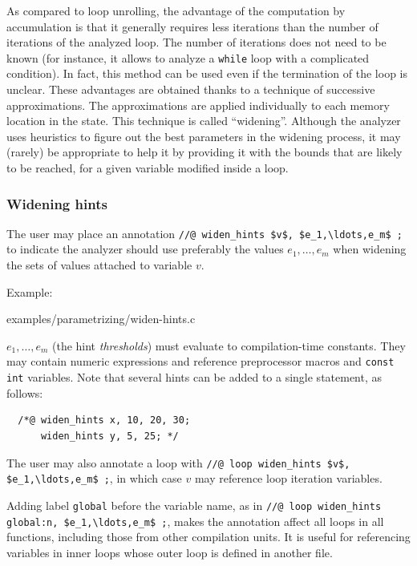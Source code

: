 \documentclass[web]{frama-c-book}
\begin{document}
As compared to loop unrolling, the advantage of the computation
by accumulation is that it generally requires less iterations
than the number of iterations of the analyzed loop. The number of
iterations does not need to be known (for instance, it allows to
analyze a \lstinline|while| loop with a complicated condition).
In fact, this method can be used even if the termination of
the loop is unclear. These advantages are obtained thanks to
a technique of successive approximations. The approximations
are applied individually to each memory location in the state.
This technique is called ``widening''.
Although the analyzer uses heuristics to figure out the best
parameters in the widening process, it may (rarely) be appropriate
to help it by providing it with the bounds that are likely to
be reached, for a given variable modified inside a loop.

\subsubsection{Widening hints}
\label{subsub:widen-hints}

The user may place an annotation \lstinline|//@ widen_hints $v$, $e_1,\ldots,e_m$ ;|
to indicate the analyzer should use preferably the values $e_1,\ldots,e_m$
when widening the sets of values attached to variable $v$.

Example:

  {examples/parametrizing/widen-hints.c}

$e_1,\ldots,e_m$ (the hint \emph{thresholds}) must evaluate to compilation-time
constants. They may contain numeric expressions and reference preprocessor
macros and \lstinline|const int| variables.
Note that several hints can be added to a single statement, as follows:

\begin{lstlisting}
  /*@ widen_hints x, 10, 20, 30;
      widen_hints y, 5, 25; */
\end{lstlisting}

The user may also annotate a loop with
\lstinline|//@ loop widen_hints $v$, $e_1,\ldots,e_m$ ;|,
in which case $v$ may reference loop iteration variables.

Adding label \lstinline|global| before the variable name, as in
\lstinline|//@ loop widen_hints global:n, $e_1,\ldots,e_m$ ;|,
makes the annotation affect all loops in all functions, including
those from other compilation units. It is useful for referencing variables
in inner loops whose outer loop is defined in another file.
\end{document}
